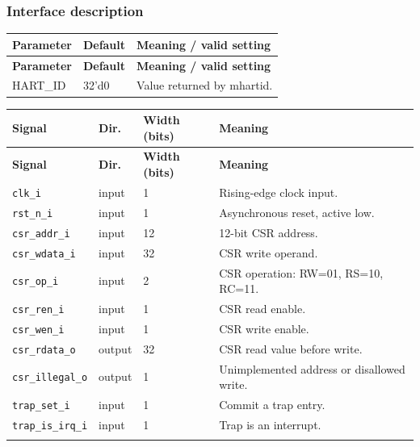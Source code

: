 \documentclass[11pt]{article}
\begin{document}
\subsubsection{Interface description}
{\small
\begin{longtable}{@{}L{0.2500\dimexpr\linewidth-24pt\relax}L{0.2300\dimexpr\linewidth-24pt\relax}L{0.5200\dimexpr\linewidth-24pt\relax}@{}}
\toprule
\textbf{Parameter} & \textbf{Default} & \textbf{Meaning / valid setting} \\ \midrule
\endfirsthead
\toprule
\textbf{Parameter} & \textbf{Default} & \textbf{Meaning / valid setting} \\ \midrule
\endhead
HART\_ID & 32'd0 & Value returned by mhartid. \\*
\bottomrule\end{longtable}}
{\small
\begin{longtable}{@{}L{0.3400\dimexpr\linewidth-36pt\relax}L{0.1000\dimexpr\linewidth-36pt\relax}L{0.1000\dimexpr\linewidth-36pt\relax}L{0.4600\dimexpr\linewidth-36pt\relax}@{}}
\toprule
\textbf{Signal} & \textbf{Dir.} & \textbf{Width (bits)} & \textbf{Meaning} \\ \midrule
\endfirsthead
\toprule
\textbf{Signal} & \textbf{Dir.} & \textbf{Width (bits)} & \textbf{Meaning} \\ \midrule
\endhead
\texttt{clk\_i} & input & 1 & Rising-edge clock input. \\ \addlinespace[3pt]
\texttt{rst\_n\_i} & input & 1 & Asynchronous reset, active low. \\ \addlinespace[3pt]
\texttt{csr\_addr\_i} & input & 12 & 12-bit CSR address. \\ \addlinespace[3pt]
\texttt{csr\_wdata\_i} & input & 32 & CSR write operand. \\ \addlinespace[3pt]
\texttt{csr\_op\_i} & input & 2 & CSR operation: RW=01, RS=10, RC=11. \\ \addlinespace[3pt]
\texttt{csr\_ren\_i} & input & 1 & CSR read enable. \\ \addlinespace[3pt]
\texttt{csr\_wen\_i} & input & 1 & CSR write enable. \\ \addlinespace[3pt]
\texttt{csr\_rdata\_o} & output & 32 & CSR read value before write. \\ \addlinespace[3pt]
\texttt{csr\_illegal\_o} & output & 1 & Unimplemented address or disallowed write. \\ \addlinespace[3pt]
\texttt{trap\_set\_i} & input & 1 & Commit a trap entry. \\ \addlinespace[3pt]
\texttt{trap\_is\_irq\_i} & input & 1 & Trap is an interrupt. \\ \addlinespace[3pt]

\end{longtable}}
\end{document}
